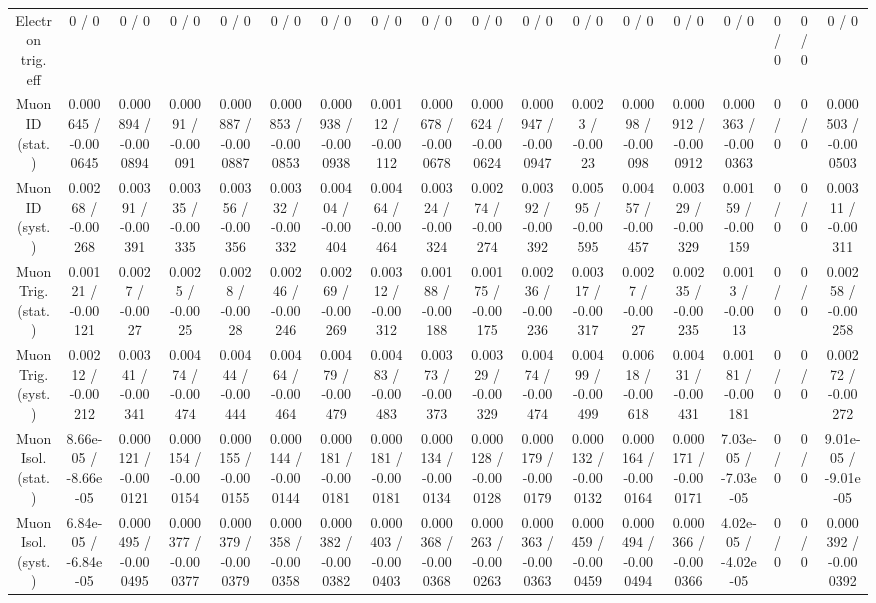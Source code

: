 \documentclass[10pt]{article}
\begin{document}
\begin{table}[htbp]
\begin{center}
\begin{tabular}{|c|c|c|c|c|c|c|c|c|c|c|c|c|c|c|c|c|c|}
  Electron trig. eff & 0 / 0 & 0 / 0 & 0 / 0 & 0 / 0 & 0 / 0 & 0 / 0 & 0 / 0 & 0 / 0 & 0 / 0 & 0 / 0 & 0 / 0 & 0 / 0 & 0 / 0 & 0 / 0 & 0 / 0 & 0 / 0 & 0 / 0 \\ 
  Muon ID (stat.) & 0.000645 / -0.000645 & 0.000894 / -0.000894 & 0.00091 / -0.00091 & 0.000887 / -0.000887 & 0.000853 / -0.000853 & 0.000938 / -0.000938 & 0.00112 / -0.00112 & 0.000678 / -0.000678 & 0.000624 / -0.000624 & 0.000947 / -0.000947 & 0.0023 / -0.0023 & 0.00098 / -0.00098 & 0.000912 / -0.000912 & 0.000363 / -0.000363 & 0 / 0 & 0 / 0 & 0.000503 / -0.000503 \\ 
  Muon ID (syst.) & 0.00268 / -0.00268 & 0.00391 / -0.00391 & 0.00335 / -0.00335 & 0.00356 / -0.00356 & 0.00332 / -0.00332 & 0.00404 / -0.00404 & 0.00464 / -0.00464 & 0.00324 / -0.00324 & 0.00274 / -0.00274 & 0.00392 / -0.00392 & 0.00595 / -0.00595 & 0.00457 / -0.00457 & 0.00329 / -0.00329 & 0.00159 / -0.00159 & 0 / 0 & 0 / 0 & 0.00311 / -0.00311 \\ 
  Muon Trig. (stat.) & 0.00121 / -0.00121 & 0.0027 / -0.0027 & 0.0025 / -0.0025 & 0.0028 / -0.0028 & 0.00246 / -0.00246 & 0.00269 / -0.00269 & 0.00312 / -0.00312 & 0.00188 / -0.00188 & 0.00175 / -0.00175 & 0.00236 / -0.00236 & 0.00317 / -0.00317 & 0.0027 / -0.0027 & 0.00235 / -0.00235 & 0.0013 / -0.0013 & 0 / 0 & 0 / 0 & 0.00258 / -0.00258 \\ 
  Muon Trig. (syst.) & 0.00212 / -0.00212 & 0.00341 / -0.00341 & 0.00474 / -0.00474 & 0.00444 / -0.00444 & 0.00464 / -0.00464 & 0.00479 / -0.00479 & 0.00483 / -0.00483 & 0.00373 / -0.00373 & 0.00329 / -0.00329 & 0.00474 / -0.00474 & 0.00499 / -0.00499 & 0.00618 / -0.00618 & 0.00431 / -0.00431 & 0.00181 / -0.00181 & 0 / 0 & 0 / 0 & 0.00272 / -0.00272 \\ 
  Muon Isol. (stat.) & 8.66e-05 / -8.66e-05 & 0.000121 / -0.000121 & 0.000154 / -0.000154 & 0.000155 / -0.000155 & 0.000144 / -0.000144 & 0.000181 / -0.000181 & 0.000181 / -0.000181 & 0.000134 / -0.000134 & 0.000128 / -0.000128 & 0.000179 / -0.000179 & 0.000132 / -0.000132 & 0.000164 / -0.000164 & 0.000171 / -0.000171 & 7.03e-05 / -7.03e-05 & 0 / 0 & 0 / 0 & 9.01e-05 / -9.01e-05 \\ 
  Muon Isol. (syst.) & 6.84e-05 / -6.84e-05 & 0.000495 / -0.000495 & 0.000377 / -0.000377 & 0.000379 / -0.000379 & 0.000358 / -0.000358 & 0.000382 / -0.000382 & 0.000403 / -0.000403 & 0.000368 / -0.000368 & 0.000263 / -0.000263 & 0.000363 / -0.000363 & 0.000459 / -0.000459 & 0.000494 / -0.000494 & 0.000366 / -0.000366 & 4.02e-05 / -4.02e-05 & 0 / 0 & 0 / 0 & 0.000392 / -0.000392 \\ 

\end{tabular}
\end{center}
\end{table}
\end{document}
